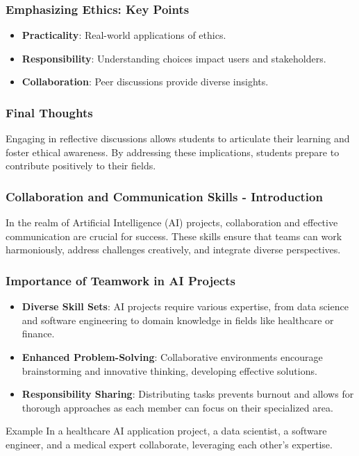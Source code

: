 \documentclass[aspectratio=169]{beamer}
\begin{document}
\begin{frame}[fragile]
    \frametitle{Emphasizing Ethics: Key Points}
    \begin{itemize}
        \item \textbf{Practicality}: Real-world applications of ethics.
        \item \textbf{Responsibility}: Understanding choices impact users and stakeholders.
        \item \textbf{Collaboration}: Peer discussions provide diverse insights.
    \end{itemize}
\end{frame}

\begin{frame}[fragile]
    \frametitle{Final Thoughts}
    Engaging in reflective discussions allows students to articulate their learning and foster ethical awareness. By addressing these implications, students prepare to contribute positively to their fields.
\end{frame}

\begin{frame}[fragile]
    \frametitle{Collaboration and Communication Skills - Introduction}
    In the realm of Artificial Intelligence (AI) projects, collaboration and effective communication are crucial for success. These skills ensure that teams can work harmoniously, address challenges creatively, and integrate diverse perspectives.
\end{frame}

\begin{frame}[fragile]
    \frametitle{Importance of Teamwork in AI Projects}
    \begin{itemize}
        \item \textbf{Diverse Skill Sets}: AI projects require various expertise, from data science and software engineering to domain knowledge in fields like healthcare or finance.
        \item \textbf{Enhanced Problem-Solving}: Collaborative environments encourage brainstorming and innovative thinking, developing effective solutions.
        \item \textbf{Responsibility Sharing}: Distributing tasks prevents burnout and allows for thorough approaches as each member can focus on their specialized area.
    \end{itemize}
    \begin{block}{Example}
        In a healthcare AI application project, a data scientist, a software engineer, and a medical expert collaborate, leveraging each other's expertise.
    \end{block}
\end{frame}
\end{document}
